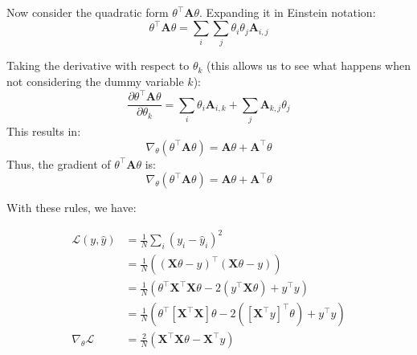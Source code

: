 {
    Now consider the quadratic form \( \theta^\top \mathbf{A} \theta \). Expanding it in Einstein notation:
    \[
        \theta^\top \mathbf{A} \theta = \sum_i \sum_j \theta_i \theta_j \mathbf{A}_{i,j}
    \]

    Taking the derivative with respect to \( \theta_k \) (this allows us to see what happens when not considering the dummy variable \( k \)):
    \[
        \frac{\partial \theta^\top \mathbf{A} \theta}{\partial \theta_k} = \sum_i \theta_i \mathbf{A}_{i,k} + \sum_j \mathbf{A}_{k,j} \theta_j
    \]
    This results in:
    \[
        \nabla_\theta (\theta^\top \mathbf{A} \theta) = \mathbf{A} \theta + \mathbf{A}^\top \theta
    \]
    Thus, the gradient of \( \theta^\top \mathbf{A} \theta \) is:
    \[
        \nabla_\theta (\theta^\top \mathbf{A} \theta) = \mathbf{A} \theta + \mathbf{A}^\top \theta
    \]

}

With these rules, we have:

\begin{align}
    \mathcal{L}(y, \hat{y})   & = \frac{1}{N} \sum_i \left( y_i - \hat{y}_i \right)^2                                                                                       \\
                              & = \frac{1}{N} \left( (\mathbf{X}\theta - y)^\top (\mathbf{X}\theta - y) \right)                                                             \\
                              & = \frac{1}{N} \left( \theta^\top \mathbf{X}^\top \mathbf{X} \theta - 2 (y^\top \mathbf{X} \theta) + y^\top y \right)                        \\
                              & = \frac{1}{N} \left( \theta^\top \left[ \mathbf{X}^\top \mathbf{X} \right] \theta - 2 ([\mathbf{X}^\top y]^ \top \theta) + y^\top y \right) \\
    \nabla_\theta \mathcal{L} & = \frac{2}{N} \left( \mathbf{X}^\top \mathbf{X} \theta - \mathbf{X}^\top y \right)
\end{align}

